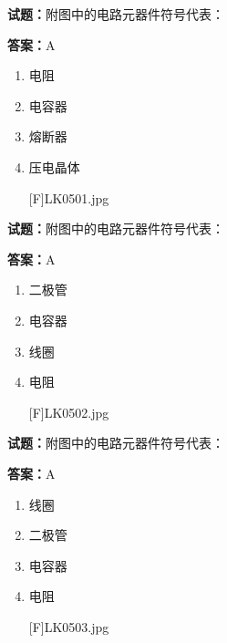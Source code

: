 \documentclass{ctexbook}
\begin{document}




\vspace{1em}

\textbf{试题：}附图中的电路元器件符号代表： 

\textbf{答案：}A 

\begin{enumerate}[leftmargin=3em]
  \item 电阻 

  \item 电容器 

  \item 熔断器 


  \item 压电晶体 

[F]LK0501.jpg 

\end{enumerate}





\vspace{1em}

\textbf{试题：}附图中的电路元器件符号代表： 

\textbf{答案：}A 

\begin{enumerate}[leftmargin=3em]
  \item 二极管 

  \item 电容器 

  \item 线圈 

  \item 电阻 

[F]LK0502.jpg 

\end{enumerate}





\vspace{1em}

\textbf{试题：}附图中的电路元器件符号代表： 

\textbf{答案：}A 

\begin{enumerate}[leftmargin=3em]
  \item 线圈 

  \item 二极管 

  \item 电容器 

  \item 电阻 

[F]LK0503.jpg 

\end{enumerate}
\end{document}
